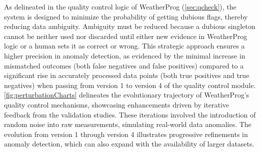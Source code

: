 \documentclass[authoryear,preprint,review,12pt]{elsarticle}
\begin{document}
As delineated in the quality control logic of WeatherProg (\cref{sec:qcheck}), the system is designed to minimize the probability of getting dubious flags, thereby reducing data ambiguity. 
Ambiguity must be reduced because a dubious singleton cannot be neither used nor discarded until either new evidence in WeatherProg logic or a human sets it as correct or wrong.
This strategic approach ensures a higher precision in anomaly detection, as evidenced by the minimal increase in mismatched outcomes (both false negatives and false positives) compared to a significant rise in accurately processed data points (both true positives and true negatives) when passing from version 1 to version 4 of the quality control module.
\cref{fig:perturbationCharts} delineates the evolutionary trajectory of WeatherProg's quality control mechanisms, showcasing enhancements driven by iterative feedback from the validation studies. 
These iterations involved the introduction of random noise into raw measurements, simulating real-world data anomalies. 
The evolution from version 1 through version 4 illustrates progressive refinements in anomaly detection, which can also expand with the availability of larger datasets.
\end{document}
